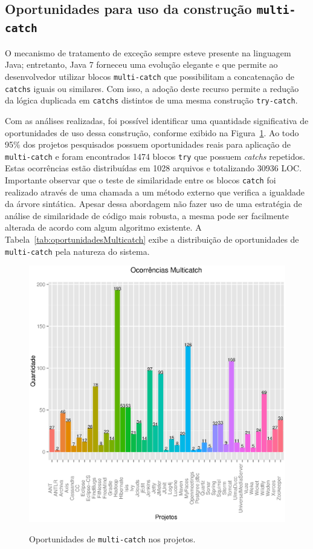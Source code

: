 \subsection{Oportunidades para uso da constru\c c\~{a}o \texttt{multi-catch}}

O mecanismo de tratamento de exceção sempre esteve 
presente na linguagem Java; entretanto, Java 7 forneceu uma 
evolução elegante e que permite ao desenvolvedor utilizar blocos \texttt{multi-catch} que possibilitam 
a concatenação de \texttt{catchs} iguais ou similares. Com isso, a adoção deste 
recurso permite a redução da lógica duplicada 
em \texttt{catchs} distintos de uma mesma construção \texttt{try-catch}.

Com as análises realizadas, foi possível identificar uma quantidade significativa de oportunidades 
de uso dessa construção, conforme exibido na Figura~\ref{fig:Muticatch}. Ao todo \num{95}\% dos projetos pesquisados possuem oportunidades reais para aplicação de \texttt{multi-catch} e
foram encontrados \num{1474} blocos \texttt{try} que possuem \textit{catchs} repetidos. 
Estas ocorrências estão distribuídas em \num{1028} arquivos e totalizando \num{30936} \acs{LOC}. 
Importante observar que o teste de  similaridade entre os blocos \texttt{catch} 
foi realizado através de uma chamada a um método externo que verifica a igualdade da árvore 
sintática. Apesar dessa abordagem não fazer uso de uma estratégia de análise 
de similaridade de código mais robusta, a mesma pode ser facilmente alterada de 
acordo com algum algoritmo existente. A Tabela~\ref{tab:oportunidadesMulticatch} exibe a distribuição de oportunidades de \texttt{multi-catch} pela natureza do sistema.

\begin{figure}[h]
	\center
	\includegraphics[scale=0.75]{Imagens/ocorrenciasMulticatch}
	\label{fig:Muticatch}
	\caption{Oportunidades de \texttt{multi-catch} nos projetos.}
\end{figure}
	
